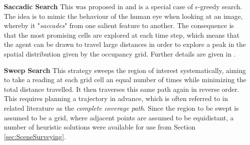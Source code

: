 
\textbf{Saccadic Search}
This was proposed in \cite{Chung2007ASearch} and is a special case of $\epsilon$-greedy search. The idea is to mimic the behaviour of the human eye when looking at an image, whereby it "\textit{saccades}" from one salient feature to another. The consequence is that the most promising cells are explored at each time step, which means that the agent can be drawn to travel large distances in order to explore a peak in the spatial distribution given by the occupancy grid. Further details are given in \cite{Chung2007ASearch}.

\textbf{Sweep Search}
This strategy sweeps the region of interest systematically, aiming to take a reading at each grid cell an equal number of times while minimizing the total distance travelled. It then traverses this same path again in reverse order. This requires planning a trajectory in advance, which is often referred to in related literature as the \textit{complete coverage path}. Since the region to be swept is assumed to be a grid, where adjacent points are assumed to be equidistant, a number of heuristic solutions were available for use from Section \ref{sec:SceneSurveying}.\par


